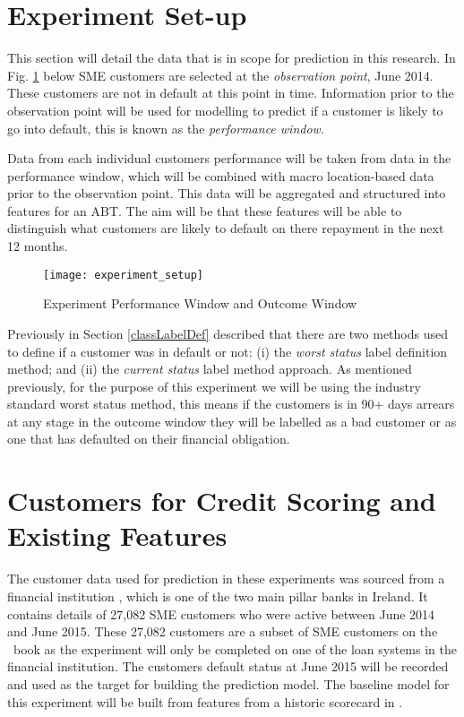 \section{Experiment Set-up}
This section will detail the data that is in scope for prediction in this research. In Fig. \ref{fig:experiment_setup1} below SME customers are selected at the \textit{observation point}, June 2014. These customers are not in default at this point in time. Information prior to the observation point will be used for modelling to predict if a customer is likely to go into default, this is known as the \textit{performance window}.

Data from each individual customers performance will be taken from data in the performance window, which will be combined with macro location-based data prior to the observation point. This data will be aggregated and structured into features for an ABT. The aim will be that these features will be able to distinguish what customers are likely to default on there repayment in the next 12 months. 

\begin{figure}[H]
	\texttt{[image: experiment\_setup]}
	\caption[Experiment Performance Window and Outcome Window]
	{Experiment Performance Window and Outcome Window}
	\label{fig:experiment_setup1}
\end{figure}

Previously in Section \ref{classLabelDef} described that there are two methods used to define if a customer was in default or not: (i) the \textit{worst status} label definition method; and (ii) the \textit{current status} label method approach. As mentioned previously, for the purpose of this experiment we will be using the industry standard worst status method, this means if the customers is in 90+ days arrears at any stage in the outcome window they will be labelled as a bad customer or as one that has defaulted on their financial obligation. 


\section{Customers for Credit Scoring and Existing Features}\label{sec:existFeatures}

The customer data used for prediction in these experiments was sourced from a financial institution \subjectname, which is one of the two main pillar banks in Ireland. It contains details of 27,082 SME customers who were active between June 2014 and June 2015. These 27,082 customers are a subset of SME customers on the \subjectname\ book as the experiment will only be completed on one of the loan systems in the financial institution. The customers default status at June 2015 will be recorded and used as the target for building the prediction model. The baseline model for this experiment will be built from features from a historic scorecard in \subjectname.

